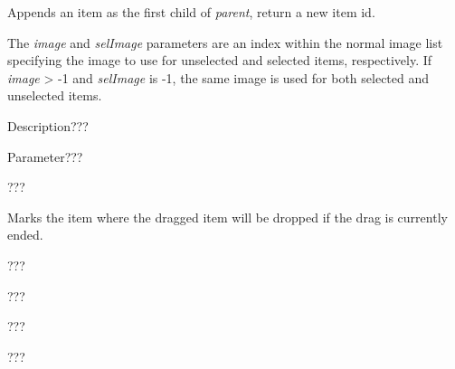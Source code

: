 Appends an item as the first child of {\it parent}, return a new item id.

The {\it image} and {\it selImage} parameters are an index within
the normal image list specifying the image to use for unselected and
selected items, respectively.
If {\it image} > -1 and {\it selImage} is -1, the same image is used for
both selected and unselected items.

\label{wxtreelistctrlrefresh}


Description???

Parameter???

\label{wxtreelistctrlsetbackgroundcolour}


???

\label{wxtreelistctrlsetdragitem}


Marks the item where the dragged item will be dropped if the drag is currently ended.

\label{wxtreelistctrlsetfocus}


???

\label{wxtreelistctrlsetfont}


???

\label{wxtreelistctrlsetforegroundcolour}


???

\label{wxtreelistctrlsetwindowstyle}


???

\label{wxtreelistctrlscrollto}


